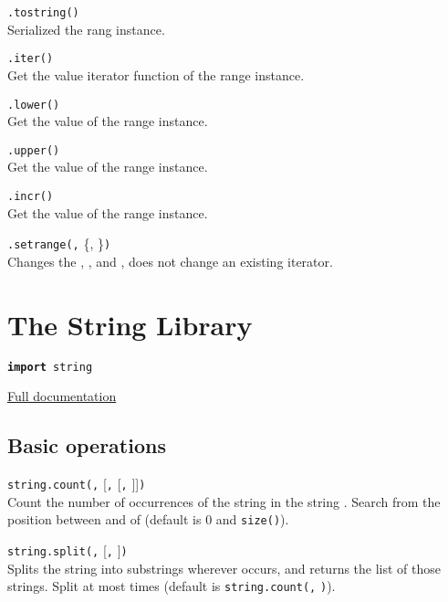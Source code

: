\hangpar {}\texttt{.tostring()}\\
Serialized the rang instance.

\hangpar {}\texttt{.iter()}\\
Get the value iterator function of the range instance. 

\hangpar {}\texttt{.lower()}\\
Get the  value of the range instance.

\hangpar {}\texttt{.upper()}\\
Get the  value of the range instance.

\hangpar {}\texttt{.incr()}\\
Get the  value of the range instance.

\hangpar {}\texttt{.setrange(}\texttt{,} \{, \}\texttt{)}\\
Changes the , , and , does not change an existing iterator.

\section*{The String Library}

\hangpar \texttt{\textbf{import} string}

\hangpar \href{https://github.com/berry-lang/berry/wiki/Chapter-7\#string-module}{Full documentation}

\subsection*{Basic operations}

\hangpar \texttt{string.count(}\texttt{,} [\texttt{,} [\texttt{,} ]]\texttt{)}\\
Count the number of occurrences of the  string in the string . Search from the position between  and  of  (default is $0$ and \texttt{size(}\texttt{)}).

\hangpar \texttt{string.split(}\texttt{,} [\texttt{,} ]\texttt{)}\\
Splits the string  into substrings wherever  occurs, and returns the list of those strings. Split at most  times (default is \texttt{string.count(}\texttt{,} \texttt{)}).

